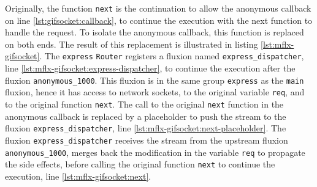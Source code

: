 Originally, the function \texttt{next} is the continuation to allow the anonymous callback on line \ref{lst:gifsocket:callback}, to continue the execution with the next function to handle the request.
To isolate the anonymous callback, this function is replaced on both ends.
The result of this replacement is illustrated in listing \ref{lst:mflx-gifsocket}.
The \texttt{express} \texttt{Router} registers a fluxion named \texttt{express\-\_dispatcher}, line \ref{lst:mflx-gifsocket:express-dispatcher}, to continue the execution after the fluxion \texttt{anonymous\-\_1000}.
This fluxion is in the same group \texttt{express} as the \texttt{main} fluxion, hence it has access to network sockets, to the original variable \texttt{req}, and to the original function \texttt{next}.
The call to the original \texttt{next} function in the anonymous callback is replaced by a placeholder to push the stream to the fluxion \texttt{express\-\_dispatcher}, line \ref{lst:mflx-gifsocket:next-placeholder}.
The fluxion \texttt{express\-\_dispatcher} receives the stream from the upstream fluxion \texttt{anonymous\-\_1000}, merges back the modification in the variable \texttt{req} to propagate the side effects, before calling the original function \texttt{next} to continue the execution, line \ref{lst:mflx-gifsocket:next}.






